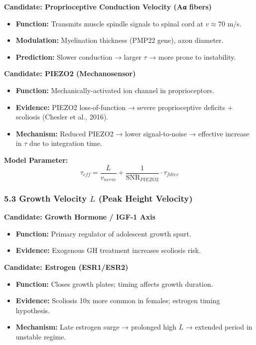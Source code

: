 \documentclass[11pt,a4paper]{article}
\begin{document}
\textbf{Candidate: Proprioceptive Conduction Velocity (Aα fibers)}

\begin{itemize}
\item \textbf{Function:} Transmits muscle spindle signals to spinal cord at $v \approx 70$ m/s.
\item \textbf{Modulation:} Myelination thickness (PMP22 gene), axon diameter.
\item \textbf{Prediction:} Slower conduction → larger $\tau$ → more prone to instability.
\end{itemize}

\textbf{Candidate: PIEZO2 (Mechanosensor)}

\begin{itemize}
\item \textbf{Function:} Mechanically-activated ion channel in proprioceptors.
\item \textbf{Evidence:} PIEZO2 loss-of-function → severe proprioceptive deficits + scoliosis (Chesler et al., 2016).
\item \textbf{Mechanism:} Reduced PIEZO2 → lower signal-to-noise → effective increase in $\tau$ due to integration time.
\end{itemize}

\textbf{Model Parameter:}
$$
\tau_{eff} = \frac{L}{v_{nerve}} + \frac{1}{\text{SNR}_{PIEZO2}} \cdot \tau_{filter}
$$

\subsubsection{5.3 Growth Velocity $\dot{L}$ (Peak Height Velocity)}

\textbf{Candidate: Growth Hormone / IGF-1 Axis}

\begin{itemize}
\item \textbf{Function:} Primary regulator of adolescent growth spurt.
\item \textbf{Evidence:} Exogenous GH treatment increases scoliosis risk.
\end{itemize}

\textbf{Candidate: Estrogen (ESR1/ESR2)}

\begin{itemize}
\item \textbf{Function:} Closes growth plates; timing affects growth duration.
\item \textbf{Evidence:} Scoliosis 10x more common in females; estrogen timing hypothesis.
\item \textbf{Mechanism:} Late estrogen surge → prolonged high $\dot{L}$ → extended period in unstable regime.
\end{itemize}
\end{document}
